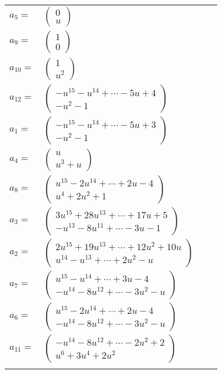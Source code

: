 \documentclass[1p]{elsarticle_modified}
\theoremstyle{definition}
\begin{document}
\begin{tabular}{m{7pt} m{180pt} m{7pt} m{180pt} }
\flushright $a_{5}=$&$\begin{pmatrix}0\\u\end{pmatrix}$ \\
\flushright $a_{9}=$&$\begin{pmatrix}1\\0\end{pmatrix}$ \\
\flushright $a_{10}=$&$\begin{pmatrix}1\\u^2\end{pmatrix}$ \\
\flushright $a_{12}=$&$\begin{pmatrix}- u^{15}- u^{14}+\cdots-5 u+4\\- u^2-1\end{pmatrix}$ \\
\flushright $a_{1}=$&$\begin{pmatrix}- u^{15}- u^{14}+\cdots-5 u+3\\- u^2-1\end{pmatrix}$ \\
\flushright $a_{4}=$&$\begin{pmatrix}u\\u^3+u\end{pmatrix}$ \\
\flushright $a_{8}=$&$\begin{pmatrix}u^{15}-2 u^{14}+\cdots+2 u-4\\u^4+2 u^2+1\end{pmatrix}$ \\
\flushright $a_{3}=$&$\begin{pmatrix}3 u^{15}+28 u^{13}+\cdots+17 u+5\\- u^{13}-8 u^{11}+\cdots-3 u-1\end{pmatrix}$ \\
\flushright $a_{2}=$&$\begin{pmatrix}2 u^{15}+19 u^{13}+\cdots+12 u^2+10 u\\u^{14}- u^{13}+\cdots+2 u^2- u\end{pmatrix}$ \\
\flushright $a_{7}=$&$\begin{pmatrix}u^{15}- u^{14}+\cdots+3 u-4\\- u^{14}-8 u^{12}+\cdots-3 u^2- u\end{pmatrix}$ \\
\flushright $a_{6}=$&$\begin{pmatrix}u^{15}-2 u^{14}+\cdots+2 u-4\\- u^{14}-8 u^{12}+\cdots-3 u^2- u\end{pmatrix}$ \\
\flushright $a_{11}=$&$\begin{pmatrix}- u^{14}-8 u^{12}+\cdots-2 u^2+2\\u^6+3 u^4+2 u^2\end{pmatrix}$\\&\end{tabular}
\end{document}
